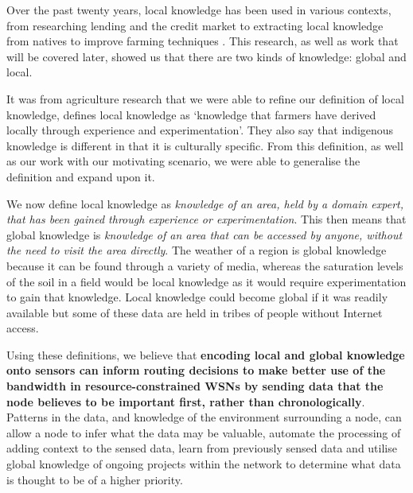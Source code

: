Over the past twenty years, local knowledge has been used in various contexts, from researching lending and the credit market \cite{Stiglitz1990} to extracting local knowledge from natives to improve farming techniques \cite{DEWALT}. This research, as well as work that will be covered later, showed us that there are two kinds of knowledge: global and local. 

It was from agriculture research that we were able to refine our definition of local knowledge, \cite{Joshi2001} defines local knowledge as ‘knowledge that farmers have derived locally through experience and experimentation’. They also say that indigenous knowledge is different in that it is culturally specific. From this definition, as well as our work with our motivating scenario, we were able to generalise the definition and expand upon it.

We now define local knowledge as \textit{knowledge of an area, held by a domain expert, that has been gained through experience or experimentation}. This then means that global knowledge is \textit{knowledge of an area that can be accessed by anyone, without the need to visit the area directly}. The weather of a region is global knowledge because it can be found through a variety of media, whereas the saturation levels of the soil in a field would be local knowledge as it would require experimentation to gain that knowledge. Local knowledge could become global if it was readily available but some of these data are held in tribes of people without Internet access.

Using these definitions, we believe that \textbf{encoding local and global knowledge onto sensors can inform routing decisions to make better use of the bandwidth in resource-constrained WSNs by sending data that the node believes to be important first, rather than chronologically}. Patterns in the data, and knowledge of the environment surrounding a node, can allow a node to infer what the data may be valuable, automate the processing of adding context to the sensed data, learn from previously sensed data and utilise global knowledge of ongoing projects within the network to determine what data is thought to be of a higher priority.

